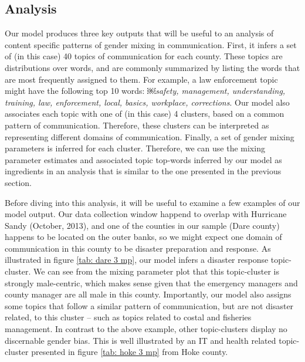 \documentclass{pnastwo}
\begin{document}
\begin{article}
\subsection{Analysis}
Our model produces three key outputs that will be useful to an analysis of content specific patterns of gender mixing in communication. First, it infers a set of (in this case) 40 topics of communication for each county. These topics are distributions over words, and are commonly summarized by listing the words that are most frequently assigned to them. For example, a law enforcement topic might have the following top 10 words:
￼\emph{safety, management, understanding, training, law, enforcement, local, basics, workplace, corrections}. Our model also associates each topic with one of (in this case) 4 clusters, based on a common pattern of communication. Therefore, these clusters can be interpreted as representing different domains of communication. Finally, a set of gender mixing parameters is inferred for each cluster. Therefore, we can use the mixing parameter estimates and associated topic top-words inferred by our model as ingredients in an analysis that is similar to the one presented in the previous section.

Before diving into this analysis, it will be useful to examine a few examples of our model output. Our data collection window happend to overlap with Hurricane Sandy (October, 2013), and one of the counties in our sample (Dare county) happens to be located on the outer banks, so we might expect one domain of communication in this county to be disaster preparation and response. As illustrated in figure \ref{tab: dare 3 mp}, our model infers a disaster response topic-cluster. We can see from the mixing parameter plot that this topic-cluster is strongly male-centric, which makes sense given that the emergency managers and county manager are all male in this county. Importantly, our model also assigns some topics that follow a similar pattern of communication, but are not disaster related, to this cluster -- such as topics related to costal and fisheries management.  In contrast to the above example, other topic-clusters display no discernable gender bias. This is well illustrated by an IT and health related topic-cluster presented in figure \ref{tab: hoke 3 mp} from Hoke county.


\end{article}
\end{document}
